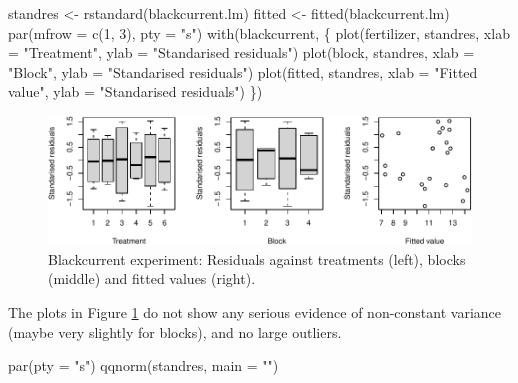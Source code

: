 \documentclass[
]{book}
\newenvironment{Shaded}{\begin{snugshade}}{\end{snugshade}}
\newcommand{\AttributeTok}[1]{\textcolor[rgb]{0.77,0.63,0.00}{#1}}
\newcommand{\DecValTok}[1]{\textcolor[rgb]{0.00,0.00,0.81}{#1}}
\newcommand{\FunctionTok}[1]{\textcolor[rgb]{0.00,0.00,0.00}{#1}}
\newcommand{\NormalTok}[1]{#1}
\newcommand{\OtherTok}[1]{\textcolor[rgb]{0.56,0.35,0.01}{#1}}
\newcommand{\StringTok}[1]{\textcolor[rgb]{0.31,0.60,0.02}{#1}}
\theoremstyle{definition}
\theoremstyle{definition}
\theoremstyle{definition}
\theoremstyle{definition}
\theoremstyle{remark}
\begin{document}
\begin{enumerate}
\begin{Shaded}
\begin{Highlighting}[]
\NormalTok{standres }\OtherTok{\textless{}{-}} \FunctionTok{rstandard}\NormalTok{(blackcurrent.lm)}
\NormalTok{fitted }\OtherTok{\textless{}{-}} \FunctionTok{fitted}\NormalTok{(blackcurrent.lm)}
\FunctionTok{par}\NormalTok{(}\AttributeTok{mfrow =} \FunctionTok{c}\NormalTok{(}\DecValTok{1}\NormalTok{, }\DecValTok{3}\NormalTok{), }\AttributeTok{pty =} \StringTok{"s"}\NormalTok{)}
\FunctionTok{with}\NormalTok{(blackcurrent, \{}
  \FunctionTok{plot}\NormalTok{(fertilizer, standres, }\AttributeTok{xlab =} \StringTok{"Treatment"}\NormalTok{, }\AttributeTok{ylab =} \StringTok{"Standarised residuals"}\NormalTok{)}
  \FunctionTok{plot}\NormalTok{(block, standres, }\AttributeTok{xlab =} \StringTok{"Block"}\NormalTok{, }\AttributeTok{ylab =} \StringTok{"Standarised residuals"}\NormalTok{)}
  \FunctionTok{plot}\NormalTok{(fitted, standres, }\AttributeTok{xlab =} \StringTok{"Fitted value"}\NormalTok{, }\AttributeTok{ylab =} \StringTok{"Standarised residuals"}\NormalTok{)}
\NormalTok{\})}
\end{Highlighting}
\end{Shaded}

  \begin{figure}

   {\centering \includegraphics{bookdown_math3014-6027_files/figure-latex/ex2-residual-plots-1-1} 

   }

   \caption{Blackcurrent experiment: Residuals against treatments (left), blocks (middle) and fitted values (right).}\label{fig:ex2-residual-plots-1}
   \end{figure}

  The plots in Figure \ref{fig:ex2-residual-plots-1} do not show any serious evidence of non-constant variance (maybe very slightly for blocks), and no large outliers.

\begin{Shaded}
\begin{Highlighting}[]
 \FunctionTok{par}\NormalTok{(}\AttributeTok{pty =} \StringTok{"s"}\NormalTok{) }
 \FunctionTok{qqnorm}\NormalTok{(standres, }\AttributeTok{main =} \StringTok{""}\NormalTok{)}
\end{Highlighting}
\end{Shaded}


\end{enumerate}
\end{document}
